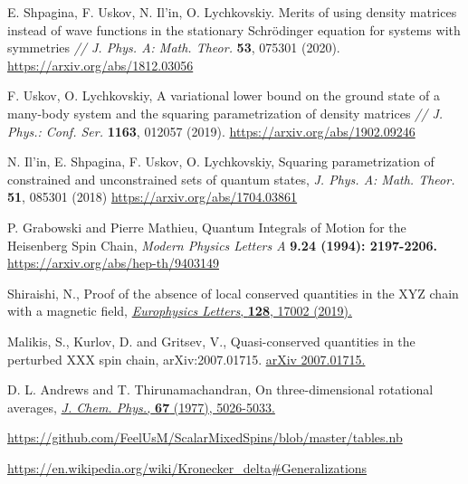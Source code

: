 \documentclass[]{article}
\renewcommand{\[}{\begin{equation}}
\renewcommand{\]}{\end{equation}}
\begin{document}
\begin{thebibliography}{99}
	

	E. Shpagina, F. Uskov, N. Il’in, O. Lychkovskiy. Merits of using density matrices instead of wave
	functions in the stationary Schrödinger equation for systems with symmetries {\it// J. Phys. A: Math. Theor.}
	{\bf 53}, 075301 (2020).
	\href{https://arxiv.org/abs/1812.03056}{https://arxiv.org/abs/1812.03056}
	
	F. Uskov, O. Lychkovskiy, A variational lower bound on the ground state of a many-body system and
	the squaring parametrization of density matrices {\it// J. Phys.: Conf. Ser.} {\bf 1163}, 012057 (2019).
	\href{https://arxiv.org/abs/1902.09246}{https://arxiv.org/abs/1902.09246}

 N. Il'in, E. Shpagina, F. Uskov, O. Lychkovskiy,
	Squaring parametrization of constrained and unconstrained sets of quantum states, {\it J. Phys. A: Math. Theor.} {\bf 51}, 085301 (2018)
	\href{https://arxiv.org/abs/1704.03861}{https://arxiv.org/abs/1704.03861}
	
	

	
	P. Grabowski and Pierre Mathieu, Quantum Integrals of Motion for the Heisenberg Spin Chain, {\it  Modern Physics Letters A} {\bf 9.24 (1994): 2197-2206.}
	\href{https://arxiv.org/abs/hep-th/9403149}{https://arxiv.org/abs/hep-th/9403149}

 Shiraishi, N., Proof of the absence of local conserved quantities in the XYZ chain with a magnetic field,  \href{https://doi.org/10.1209/0295-5075/128/17002}{
    {\it Europhysics Letters}, {\bf 128}, 17002 (2019).
    }
    
 Malikis, S., Kurlov, D. and Gritsev, V., Quasi-conserved quantities in the perturbed XXX spin chain, arXiv:2007.01715. \href{https://arxiv.org/abs/2007.01715}{arXiv 2007.01715.}

	D. L. Andrews and T. Thirunamachandran, On three-dimensional rotational averages, \href{https://doi.org/10.1063/1.434725} {{\it J. Chem. Phys.,} {\bf 67} (1977), 5026-5033.}

	\href{https://github.com/FeelUsM/ScalarMixedSpins/blob/master/tables.nb}
	{https://github.com/FeelUsM/ScalarMixedSpins/blob/master/tables.nb}
	
	\href{https://en.wikipedia.org/wiki/Kronecker_delta#Generalizations}
	{https://en.wikipedia.org/wiki/Kronecker\_delta\#Generalizations}
	
\end{thebibliography}
\end{document}
